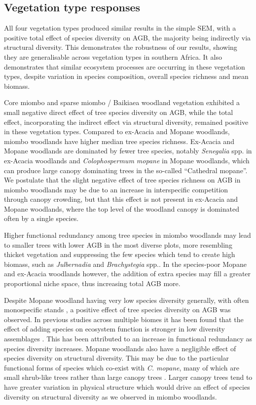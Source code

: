 \documentclass[12pt,a4paper]{article}
\begin{document}
\subsection{Vegetation type responses}

All four vegetation types produced similar results in the simple SEM, with a positive total effect of species diversity on AGB, the majority being indirectly via structural diversity. This demonstrates the robustness of our results, showing they are generalisable across vegetation types in southern Africa. It also demonstrates that similar ecosystem processes are occurring in these vegetation types, despite variation in species composition, overall species richness and mean biomass.

Core miombo and sparse miombo / Baikiaea woodland vegetation exhibited a small negative direct effect of tree species diversity on AGB, while the total effect, incorporating the indirect effect via structural diversity, remained positive in these vegetation types. Compared to ex-Acacia and Mopane woodlands, miombo woodlands have higher median tree species richness. Ex-Acacia and Mopane woodlands are dominated by fewer tree species, notably \textit{Senegalia} spp. in ex-Acacia woodlands and \textit{Colophospermum mopane} in Mopane woodlands, which can produce large canopy dominating trees in the so-called ``Cathedral mopane''. We postulate that the slight negative effect of tree species richness on AGB in miombo woodlands may be due to an increase in interspecific competition through canopy crowding, but that this effect is not present in ex-Acacia and Mopane woodlands, where the top level of the woodland canopy is dominated often by a single species. 

Higher functional redundancy among tree species in miombo woodlands may lead to smaller trees with lower AGB in the most diverse plots, more resembling thicket vegetation and suppressing the few species which tend to create high biomass, such as \textit{Julbernadia} and \textit{Brachystegia} spp.. In the species-poor Mopane and ex-Acacia woodlands however, the addition of extra species may fill a greater proportional niche space, thus increasing total AGB more. 

Despite Mopane woodland having very low species diversity generally, with often monospecific stands \citep{Timberlake2010}, a positive effect of tree species diversity on AGB was observed. In previous studies across multiple biomes it has been found that the effect of adding species on ecosystem function is stronger in low diversity assemblages \citep{Cardinale2006, Srivastava2005}. This has been attributed to an increase in functional redundancy as species diversity increases. Mopane woodlands also have a negligible effect of species diversity on structural diversity. This may be due to the particular functional forms of species which co-exist with \textit{C. mopane}, many of which are small shrub-like trees rather than large canopy trees \citep{Timberlake2010}. Larger canopy trees tend to have greater variation in physical structure \citep{Seidel2019} which would drive an effect of species diversity on structural diversity as we observed in miombo woodlands.
\end{document}
